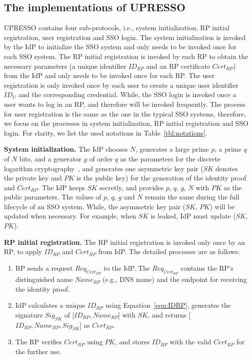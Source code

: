 \subsection{The implementations of UPRESSO}
\label{implementations}
UPRESSO contains four sub-protocols, i.e., system initialization, RP initial registration, user registration and SSO login.
The system initialization is invoked by the IdP to initialize the SSO system and only needs to be invoked once for each SSO system.
The RP initial registration is invoked by each RP to obtain the necessary parameters (a unique identifier $ID_{RP}$ and an RP certificate $Cert_{RP}$) from the IdP and only needs to be invoked once for each RP.
The user registration is only invoked once by each user to create a unique user identifier $ID_U$ and the corresponding credential.
While, the SSO login is invoked once a user wants to log in an RP, and therefore will be invoked frequently.
The process for user registration is the same as the one in the typical SSO systems,
therefore, we focus on the processes in  system initialization, RP initial registration and SSO login.
For clarity, we list the used notations  in Table~\ref{tbl:notations}.

\vspace{1mm}\noindent \textbf{System initialization.} The IdP chooses $N$, generates a large prime $p$, a prime $q$ of $N$ bits, and a generator $g$ of order $q$ as  the parameters for the discrete logarithm cryptography~\cite{gallagher2013digital}, and generates one asymmetric key pair ($SK$ denotes the private key and $PK$ is the public key) for the generation of the identity proof and $Cert_{RP}$.
The IdP keeps $SK$ secretly, and provides $p$, $q$, $g$, $N$ with $PK$ as the public parameters.
The values of $p$, $q$, $g$ and $N$ remain the same during the full lifecycle of an SSO system.
While, the asymmetric key pair ($SK$, $PK$) will be updated when necessary. For example, when $SK$ is leaked, IdP must update ($SK$,$PK$).

\vspace{1mm}\noindent\textbf{RP initial registration.}
The RP initial registration is invoked only once by an RP, to apply $ID_{RP}$ and $Cert_{RP}$ from IdP.
The detailed processes are as follows:
\begin{enumerate}
\item RP sends a request $Req_{Cert_{RP}}$ to the IdP. The $Req_{Cert_{RP}}$ contains the RP's distinguished name $Name_{RP}$ (e.g., DNS name) and the endpoint for receiving the identity proof.
\item IdP calculates a unique $ID_{RP}$ using Equation~\ref{equ:IDRP},  generates the signature $Sig_{SK}$ of [$ID_{RP}, Name_{RP}$] with $SK$, and returns [$ID_{RP}, Name_{RP}, Sig_{SK}$] as $Cert_{RP}$.
\item The RP  verifies $Cert_{RP}$ using $PK$,  and stores $ID_{RP}$ with the valid $Cert_{RP}$ for the further use.
\end{enumerate}

